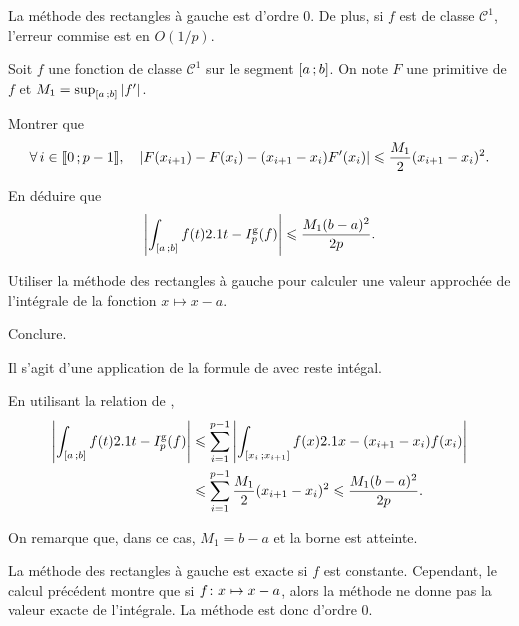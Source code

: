 \begin{prop}
La méthode des rectangles à gauche est d'ordre $0$. De plus, si $f$ est de classe $\mathscr{C}^1$, l'erreur commise est en $O(1/p)$.
\end{prop}

\begin{exercice}
Soit $f$ une fonction de classe $\mathscr{C}^1$ sur le segment $\interff{a}{b}$. On note $F$ une primitive de $f$ et $M_1 = \sup_{\interff{a}{b}} \module{f'}$.
\begin{questions}
\item Montrer que
\[
\forall i \in \interent{0}{p-1},\quad 
\module{F(x_{i+1}) - F(x_i) - (x_{i+1} - x_i) F'(x_i)} \leqslant \frac{M_1}{2} (x_{i+1}-x_i)^2.
\]

\item En déduire que
\[
\module{\int_{\interff{a}{b}} f(t) \d t - I_p^\mathrm{g}(f)}
\leqslant \frac{M_1 (b-a)^2}{2 p}.
\]

\item Utiliser la méthode des rectangles à gauche pour calculer une valeur approchée de l'intégrale de la fonction $x \mapsto x - a$.

\item Conclure.
\end{questions}
\end{exercice}

\begin{elemsolution}

\begin{reponses}
\item Il s'agit d'une application de la formule de  avec reste intégal.

\item En utilisant la relation de ,
\begin{align*}
\module{\int_{\interff{a}{b}} f(t) \d t - I_p^\mathrm{g}(f)}
&\leqslant \sum_{i=1}^{p-1} \module{\int_{\interff{x_i}{x_{i+1}}} f(x) \d x - (x_{i+1} - x_i) f(x_i)}\\
&\leqslant \sum_{i=1}^{p-1} \frac{M_1}{2} (x_{i+1} - x_i)^2
\leqslant \frac{M_1 (b-a)^2}{2 p}.
\end{align*}

\item On remarque que, dans ce cas, $M_1 = b - a$ et la borne est atteinte.

\item La méthode des rectangles à gauche est exacte si $f$ est constante. Cependant, le calcul précédent montre que si $\fonctionligne[f]{x}{x - a}$, alors la méthode ne donne pas la valeur exacte de l'intégrale. La méthode est donc d'ordre $0$.
\end{reponses}
\end{elemsolution}

